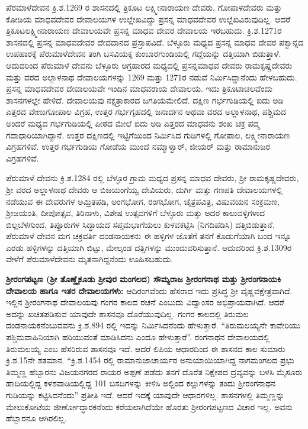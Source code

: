 ಪೆರಮಾಳೆದೇವನ ಕ್ರಿ.ಶ.1269 ರ ಶಾಸನದಲ್ಲಿ ತ್ರಿಕೂಟ ಲಕ್ಷ್ಮೀನಾರಾಯಣ ದೇವರು, ಗೋಪಾಳದೇವರು ಮತ್ತು ಕೋಡಿಯ ಮಾಧವದೇವರ ದೇವಾಲಯಗಳ ಉಲ್ಲೇಖವಿದ್ದು ಪ್ರಸನ್ನ ಮಾಧವದೇವರ ಉಲ್ಲೆಖವಿರುವುದಿಲ್ಲ. ಆದರೆ ತ್ರಿಕೂಟಲಕ್ಷ್ಮೀನಾರಾಯಣ ದೇವಾಲಯವೇ ಪ್ರಸನ್ನ ಮಾಧವ ದೇವರ ದೇವಾಲಯ ಇರಬಹುದು. ಕ್ರಿ.ಶ.1271ರ ಶಾಸನದಲ್ಲಿ ಪ್ರಸನ್ನ ಮಾಧವದೇವರ ದೇವದಾನದ ಪ್ರಸ್ತಾಪವಿದೆ. ಬೆಳ್ಳೂರು ಮಧ್ಯದ ಪ್ರಸನ್ನ ಮಾಧವ ದೇವರ ಪಕ್ವಾನ್ನದ ಉಪಹಾರಕ್ಕೆ ಪೆರುಮಾಳೆದೇವನ ತಂಗಿ ಬಸವಿಯಕ್ಕ ಕುಂಬಾರಗುಂಡಿಯಲ್ಲಿ ಗದ್ದೆಯನ್ನು ದತ್ತಿಯಾಗಿ ಬಿಡುತ್ತಾಳೆ. ಆದುದರಿಂದ ಪೆರುಮಾಳೆ ದೇವನು ಬೆಳ್ಳೂರು ಅಗ್ರಹಾರದ ಮಧ್ಯದಲ್ಲಿ ಪ್ರಸನ್ನಮಾಧವ ದೇವರು ರಾಮಕೃಷ್ಣದೇವರು ಮತ್ತು ವರದ ಅಲ್ಲಾಳನಾಥ ದೇವಾಲಯಗಳನ್ನು 1269 ಮತ್ತು 1271ರ ನಡುವೆ ನಿರ್ಮಿಸಿದ್ದಾನೆಂದು ಹೇಳಬಹುದು. ಪ್ರಸನ್ನ ಮಾಧವದೇವರ ದೇವಾಲಯವೇ ಇಂದಿನ ಮಾಧವರಾಯ ದೇವಾಲಯ. ಇದು ತ್ರಿಕೂಟಾಚಲವೆಂದು ಶಾಸನಗಳಲ್ಲೇ ಹೇಳಿದೆ. ದೇವಾಲಯವು ನಕ್ಷತ್ರಾಕಾರದ ಜಗತಿಯಮೇಲಿದೆ. ದಕ್ಷಿಣ ಗರ್ಭಗುಡಿಯಲ್ಲಿ ಐದು ಅಡಿ ಎತ್ತರದ ವೇಣುಗೋಪಾಲ ವಿಗ್ರಹ, ಉತ್ತರ ಗರ್ಭಗೃಹದಲ್ಲಿ ಜನಾರ್ದನ ಅಥವಾ ವರದ ಅಲ್ಲಾಳನಾಥ, ಪಶ್ಚಿಮದ ಅಂದರೆ ಮಧ್ಯದ ಗರ್ಭಗುಡಿಯಲ್ಲಿ ಪೀಠದ ಮೇಲೆ ಐದು ಅಡಿ ಎತ್ತರದ ಮಾಧವನು ಶಂಖ ಚಕ್ರ ಪದ್ಮ ಗದಾಧಾರಿಯಾಗಿದ್ದಾನೆ. ಉತ್ತರ ದಕ್ಷಿಣದಲ್ಲಿ ಇಟ್ಟಿಗೆಯಿಂದ ನಿರ್ಮಿಸಿದ ಗುಡಿಗಳಲ್ಲಿ ಗೋಪಾಲ, ಲಕ್ಷ್ಮೀನಾರಾಯಣ ವಿಗ್ರಹಗಳಿವೆ. ಉತ್ತರ ಗರ್ಭಗುಡಿಯ ಗೋಡೆಯ ಮುಂದೆ ನಮ್ಮಾಳ್ವಾರ್​, ಜೀಯರ್​ ಮತ್ತು ರಾಮಾನುಜರ ವಿಗ್ರಹಗಳಿವೆ.

ಪೆರುಮಾಳೆ ದೇವನು ಕ್ರಿ.ಶ.1284 ರಲ್ಲಿ ಬೆಳ್ಳೂರ ಗ್ರಾಮ ಮಧ್ಯದ ಪ್ರಸನ್ನ ಮಾಧವ ದೇವರು, ಶ‍್ರೀ ರಾಮಕೃಷ್ಣದೇವರು, ಶ‍್ರೀ ವರದ ಅಲ್ಲಾಳನಾಥ ದೇವರು ಆ ಬಿಜಯಂಗೆಯ್ವ ದೇವಿಯರು, ದುರ್ಗಿ ಮತ್ತು ಗಣಪತಿ ದೇವಾಲಯಗಳಲ್ಲಿ ನಡೆಯುವ ಈ ದೇವರುಗಳ ಅಮ್ರಿತಪಡಿ, ಅಂಗಭೋಗ, ರಂಗಭೋಗ, ಚೈತ್ರಪವಿತ್ರ, ವಿಷುವಯನ ಸಂಕ್ರಮಣ, ಶ‍್ರೀಜಯಂತಿ, ದೀಪೋತ್ಸವ, ತಿರಿನಾಳು, ವಿಶೇಷ ಉತ್ಸವಗಳಿಗೆ ಬೆಳ್ಳೂರು ಮತ್ತು ಅದರ ಕಾಲುವಳ್ಳಿಗಳಾದ ಬಿಲ್ಲಬೆಳಗುಂದ, ತಿಪ್ಪೂರುಗಳ ಸಿದ್ಧಾಯದ ಸಪ್ತಮಭಾಗೆಯಲು ಕುಳವಕಟ್ಟಿಸಿ (ನಿಗದಿಪಡಿಸಿ) ದತ್ತಿಬಿಡುತ್ತಾನೆ. ಪೆರುಮಾಳೆ ದೇವನ ಮಗ ಚಕ್ರವರ್ತಿ ದಂಡನಾಯಕನು ಈ ಹಳ್ಳಿಗಳ ಜೊತೆಗೆ ತನಗೆ ಕೊಡುಗೆಯಾಗಿ ಬಂದ ಇನ್ನೂ ಎರಡು ಹಳ್ಳಿಗಳನ್ನು ದತ್ತಿಯಾಗಿ ಬಿಟ್ಟು, ಮೇಲ್ಕಂಡ ದತ್ತಿಗಳನ್ನು ಮುಂದುವರಿಸುತ್ತಾನೆ. ಆದುದರಿಂದ ಕ್ರಿ.ಶ.1309ರ ವೇಳೆಗೆ ಪೆರುಮಾಳೆದೇವನು ಮೃತನಾಗಿದ್ದನೆಂದು ಊಹಿಸಬಹುದು.

\textbf{ಶ‍್ರೀರಂಗಪಟ್ಟಣ (ಶ‍್ರೀ ತೊಣ್ಣೈಕೂಡು ಶ‍್ರೀವುರ ಮಂಗಲದ) ಸೌಮ್ಯರಾಜ ಶ‍್ರೀರಂಗನಾಥ ಮತ್ತು ಶ‍್ರೀರಂಗನಾಯಕಿ ದೇವಾಲಯ ಹಾಗೂ ಇತರ ದೇವಾಲಯಗಳು:} ಆದಿರಂಗವೆಂದು ಹೆಸರಾದ ಇದು ಪ್ರಸಿದ್ಧ ಶ‍್ರೀ ವೈಷ್ಣವಕ್ಷೇತ್ರವಾಗಿದೆ. ಇಲ್ಲಿನ ಶ‍್ರೀರಂಗನಾಥ ದೇವಾಲಯವು ಗಂಗರ ಕಾಲದ ರಚನೆ ಎಂಬುದು ವಿದ್ವಾಂಸರ ಅಭಿಪ್ರಾಯವಾಗಿದೆ. ಆದರೆ ಅದನ್ನು ಖಚಿತಪಡಿಸುವ ಯಾವುದೇ ಶಾಸನವೂ ದೊರೆಯುವುದಿಲ್ಲ. ಗಂಗರ ಕಾಲದಲ್ಲಿ ತಿರುಮಲ ದಂಡನಾಯಕನೆಂಬುವವನು ಕ್ರಿ.ಶ.894 ರಲ್ಲಿ ಇದನ್ನು ನಿರ್ಮಿಸಿದನೆಂದು ಹೇಳುತ್ತಾರೆ. “ತಿರುಮಲಯ್ಯನೇ ಕಾವೇರಿಯು ಪಶ್ಚಿಮವಾಹಿನಿಯಾಗಿ ಹರಿಯುವಂತೆ ಮಾಡಿಸಿದನು ಎಂದೂ ಹೇಳುತ್ತಾರೆ”. ರಂಗನಾಥನ ದೇವಾಲಯದಲ್ಲಿ ತಿರುಮಲಯ್ಯ ಎಂಬ ಹೆಸರಿರುವ ಶಾಸನವೂ ಇದೆ. ಆದರೆ ಲಿಪಿಯ ಆಧಾರದಿಂದ ಈ ಶಾಸನದ ಕಾಲ ಸುಮಾರು ಕ್ರಿ.ಶ.15ನೇ ಶತಮಾನ. “ಕ್ರಿ.ಶ.1454 ರಲ್ಲಿ ರಾಮಾನುಜಾಚಾರ್ಯರ ಅನುಯಾಯಿಯಾಗಿದ್ದ ನಾಗಮಂಗಲದ ಪ್ರಭು ತಿಮ್ಮಣ್ಣ ಹೆಬ್ಬಾರನು ವಿಜಯನಗರದ ರಾಯರ ಅಪ್ಪಣೆ ಪಡೆದು ತನಗೆ ದೊರೆತ ನಿಕ್ಷೇಪದ ದ್ರವ್ಯವನ್ನು ಬಳಸಿ ಮೈಸೂರು ಹಾದಿಯಲ್ಲಿದ್ದ ಕಳಶವಾಡಿಯಲ್ಲಿದ್ದ 101 ಬಸದಿಗಳನ್ನು ಕೀಳಿಸಿ ಅಲ್ಲಿಂದ ಕಲ್ಲುಗಳನ್ನು ತಂದು ಶ‍್ರೀರಂಗನಾಥನ ಗುಡಿಯನ್ನು ಕಟ್ಟಿಸಿದನೆಂದು” ಪ್ರತೀತಿ ಇದೆ. ಆದರೆ ಇದಕ್ಕೆ ಯಾವುದೇ ಆಧಾರಗಳಿಲ್ಲ. ಶಾಸನಗಳಲ್ಲಿ ತಿಮ್ಮಣ್ಣನ್ನು ಮೇಲುಕೋಟೆಯ ಜೀರ್ಣೋದ್ಧಾರಕನೆಂದು ಕರೆಯಲಾಗಿದೆಯೇ ಹೊರತು ಶ‍್ರೀರಂಗಪಟ್ಟಣದ ವಿಚಾರ ಇಲ್ಲ. ಅವನು ಹೆಬ್ಬಾರನೂ ಆಗಿರಲಿಲ್ಲ.

